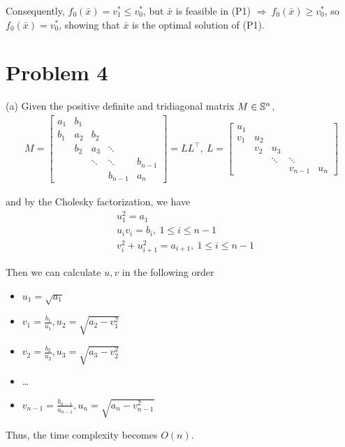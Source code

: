 \documentclass[11pt]{article}
\newcommand{\T}{^\top}          %
\begin{document}
Consequently, $f_0(\bar{x})=v_1^* \leq v_0^*$, but $\bar{x}$ is feasible in (P1) $\Rightarrow\ f_0(\bar{x}) \geq v_0^*$, so $f_0(\bar{x})=v_0^*$, showing that $\bar{x}$ is the optimal solution of (P1).


\clearpage
\section*{Problem 4}

(a)
Given the positive definite and tridiagonal matrix $M\in{{\mathbb{S}}}^n$,
\begin{align*}
  M = 
  \begin{bmatrix}
    a_1 & b_1 &     &   & \\
    b_1 & a_2 & b_2 &   & \\
        & b_2 & a_3 &\ddots&\\
        &     &\ddots&\ddots& b_{n-1}\\
        &     &     & b_{n-1} & a_n
  \end{bmatrix}
  = LL\T, \ 
  L = 
  \begin{bmatrix}
    u_1 &     &     & \\
    v_1 & u_2 &     & \\
        & v_2 & u_3 & \\
        &     & \ddots & \ddots \\
        &     & & v_{n-1} & u_n
  \end{bmatrix}
\end{align*}

and by the Cholesky factorization, we have
\begin{align*}
  & u_1^2 = a_1\\
  & u_i v_i = b_i, \ 1\leq i\leq n-1\\
  & v_i^2 + u_{i+1}^2 = a_{i+1}, \ 1 \leq i\leq n-1
\end{align*}

Then we can calculate $u, v$ in the following order
\begin{itemize}
  \item $u_1 = \sqrt{a_1}$
  \item $v_1 = \frac{b_1}{u_1}, u_2 = \sqrt{a_2 - v_1^2}$
  \item $v_2 = \frac{b_2}{u_2}, u_3 = \sqrt{a_3 - v_2^2}$
  \item \dots
  \item $v_{n-1} = \frac{b_{n-1}}{u_{n-1}}, u_n = \sqrt{a_n - v_{n-1}^2}$
\end{itemize}

Thus, the time complexity becomes $O(n)$.
\end{document}
